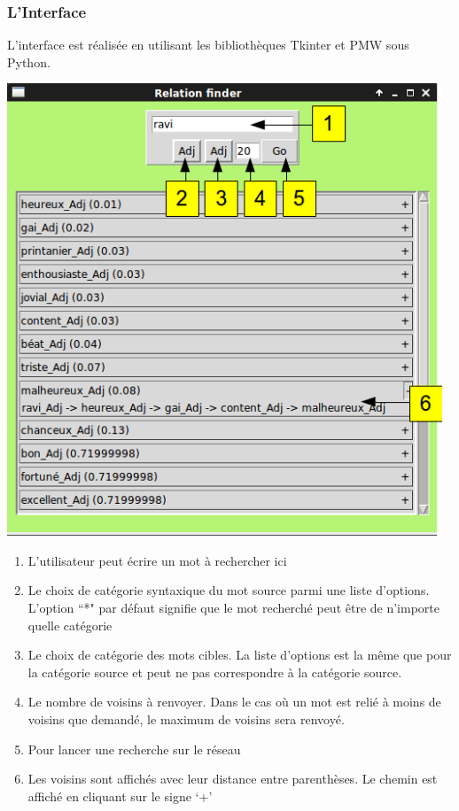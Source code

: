 \subsubsection{L'Interface}

L'interface est réalisée en utilisant les bibliothèques Tkinter et PMW sous 
Python.

\begin{center}
\includegraphics[width=13cm]{relationfinderinterface.png}
\end{center}

\begin{enumerate}
    \item{L'utilisateur peut écrire un mot à rechercher ici}
    \item{Le choix de catégorie syntaxique du mot source parmi une liste 
    d'options. L'option ``*" par défaut signifie que le mot recherché peut être 
    de n'importe quelle catégorie}
    \item{Le choix de catégorie des mots cibles. La liste d'options est la même 
    que pour la catégorie source et peut ne pas correspondre à la catégorie 
    source.}
    \item{Le nombre de voisins à renvoyer. Dans le cas où un mot est relié à 
    moins de voisins que demandé, le maximum de voisins sera renvoyé.}
    \item{Pour lancer une recherche sur le réseau}
    \item{Les voisins sont affichés avec leur distance entre parenthèses. Le 
    chemin est affiché en cliquant sur le signe \lq{+}\rq{}}   

\end{enumerate}

